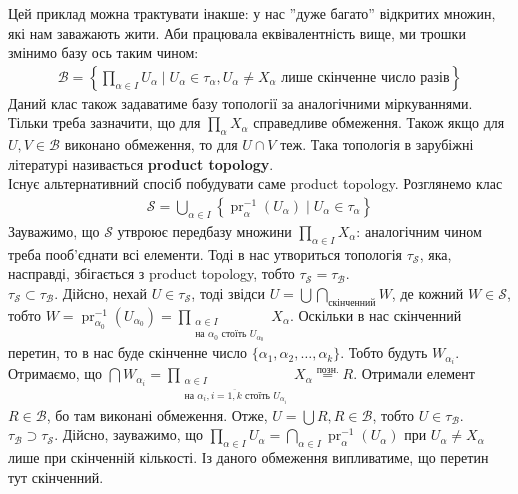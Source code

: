 \documentclass[a4paper, 10pt]{article}
\theoremstyle{theoremdd}
\DeclareMathOperator{\pr}{pr}
\begin{document}
\noindent
Цей приклад можна трактувати інакше: у нас ''дуже багато'' відкритих множин, які нам заважають жити. Аби працювала еквівалентність вище, ми трошки змінимо базу ось таким чином:
\begin{align*}
\mathcal{B} = \left\{ \prod_{\alpha \in I} U_\alpha \mid U_\alpha \in \tau_\alpha, U_\alpha \neq X_\alpha \text{ лише скінченне число разів} \right\}
\end{align*}
Даний клас також задаватиме базу топології за аналогічними міркуваннями. Тільки треба зазначити, що для $\displaystyle\prod_{\alpha} X_\alpha$ справедливе обмеження. Також якщо для $U,V \in \mathcal{B}$ виконано обмеження, то для $U \cap V$ теж. Така топологія в зарубіжні літературі називається \textbf{product topology}.
\bigskip \\
Існує альтернативний спосіб побудувати саме product topology. Розглянемо клас
\begin{align*}
\mathcal{S} = \displaystyle\bigcup_{\alpha \in I}\left\{ \pr_\alpha^{-1}(U_\alpha) \mid U_\alpha \in \tau_\alpha \right\}
\end{align*}
Зауважимо, що $\mathcal{S}$ утвроює передбазу множини $\displaystyle\prod_{\alpha \in I} X_\alpha$: аналогічним чином треба пооб'єднати всі елементи. Тоді в нас утвориться топологія $\tau_{\mathcal{S}}$, яка, насправді, збігається з product topology, тобто $\tau_{\mathcal{S}} = \tau_{\mathcal{B}}$.\\
$\tau_{\mathcal{S}} \subset \tau_{\mathcal{B}}$. Дійсно, нехай $U \in \tau_{\mathcal{S}}$, тоді звідси $U = \displaystyle\bigcup \bigcap_{\text{скінченний}} W$, де кожний $W \in \mathcal{S}$, тобто $\displaystyle W = \pr_{\alpha_0}^{-1}(U_{\alpha_0}) = \prod_{\substack{\alpha \in I \\ \text{на $\alpha_0$ стоїть $U_{\alpha_0}$}}} X_\alpha$. Оскільки в нас скінченний перетин, то в нас буде скінченне число $\{\alpha_1,\alpha_2,\dots,\alpha_k\}$. Тобто будуть $W_{\alpha_i}$. Отримаємо, що $\displaystyle\bigcap W_{\alpha_i} = \prod_{\substack{\alpha \in I \\ \text{на $\alpha_i, i = \overline{1,k}$ стоїть $U_{\alpha_i}$}}} X_\alpha \overset{\text{позн.}}{=} R$. Отримали елемент $R \in \mathcal{B}$, бо там виконані обмеження. Отже, $U = \displaystyle\bigcup R, R \in \mathcal{B}$, тобто $U \in \tau_{\mathcal{B}}$.\\
$\tau_\mathcal{B} \supset \tau_{\mathcal{S}}$. Дійсно, зауважимо, що $\displaystyle\prod_{\alpha \in I} U_\alpha = \bigcap_{\alpha \in I} \pr_\alpha^{-1}(U_\alpha)$ при $U_\alpha \neq X_\alpha$ лише при скінченній кількості. Із даного обмеження випливатиме, що перетин тут скінченний.
\end{document}

